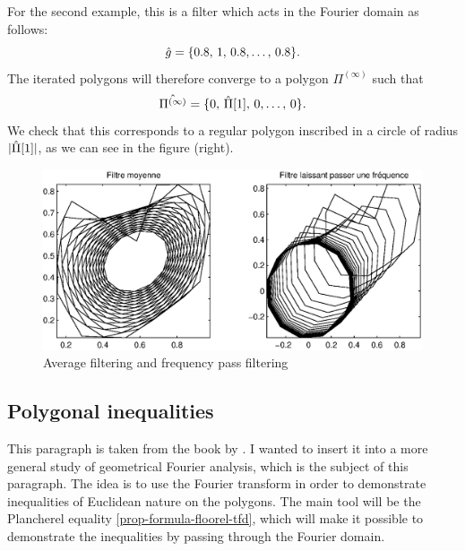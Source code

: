  
\begin{exmp}
For the second example, this is a filter which acts in the Fourier domain as follows:
\begin{equation*}
\hat{g} = \{0.8, \, 1, \, 0.8, \ldots, \, 0.8 \}.
\end{equation*}
The iterated polygons will therefore converge to a polygon $ \Pi^{(\infty)} $ such that
\begin{equation*}
\hat{\Pi^{(\infty)}} = \{0, \, \hat{\Pi}[1], \, 0, \ldots, \, 0 \}.
\end{equation*}
We check that this corresponds to a regular polygon inscribed in a circle of radius $ | \hat{\Pi}[1] | $, as we can see in the figure  (right).
\end{exmp}

\begin{figure}[ht] 
    \begin{center}
    \includegraphics[scale=0.6]{images/filtre-polygones-2.eps}
    \end{center}
    \caption{Average filtering and frequency pass filtering}
              \label{fig-filter-polygons-2}
\end{figure}
 
\subsection{Polygonal inequalities}
 
 
 This paragraph is taken from the book by  \cite{terras}. I wanted to insert it into a more general study of geometrical Fourier analysis, which is the subject of this paragraph. The idea is to use the Fourier transform in order to demonstrate inequalities of Euclidean nature on the polygons. The main tool will be the Plancherel equality \ref{prop-formula-floorel-tfd}, which will make it possible to demonstrate the inequalities by passing through the Fourier domain.
 
